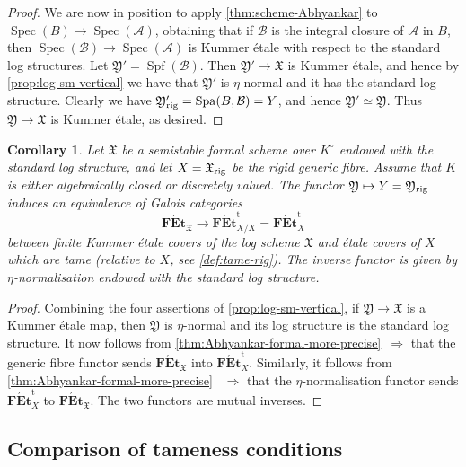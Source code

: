\documentclass[a4paper,twoside,11pt,reqno]{amsart}
\newcommand{\fX}{{\mathfrak{X}}}
\newcommand{\fY}{{\mathfrak{Y}}}
\DeclareMathOperator{\Spec}{Spec}
\DeclareMathOperator{\Spf}{Spf}
\DeclareMathOperator{\Spa}{Spa}
\newcommand{\cat}[1]{\mathbf{#1}}
\newcommand{\FEt}{\cat{F\acute{E}t}}
\newcommand{\FEtt}{{\cat{F\acute{E}t}}^{\!\mathrm{t}}}
\newcommand{\rig}{{\rm rig}}
\newtheorem{cor}[thm]{Corollary}
\theoremstyle{definition}
\numberwithin{equation}{subsection}
\begin{document}
\begin{proof}
We are now in position to apply \cref{thm:scheme-Abhyankar} to $\Spec(B) \to \Spec(\mathcal{A})$, obtaining that if $\mathcal{B}$ is the integral closure of $\mathcal{A}$ in $B$, then $\Spec(\mathcal{B})\to\Spec(\mathcal{A})$ is Kummer \'etale with respect to the standard log structures. Let $\fY' = \Spf(\mathcal{B})$. Then $\fY'\to \fX$ is Kummer \'etale, and hence by \cref{prop:log-sm-vertical} we have that $\fY'$ is $\eta$-normal and it has the standard log structure. Clearly we have $\fY'_\rig = \Spa(B, \mathcal{B}) = Y$, and hence $\fY'\simeq \fY$. Thus $\fY\to \fX$ is Kummer \'etale, as desired.
\end{proof}

\begin{cor}
\label{cor:generic fibre and eta normalisation}
    Let $\fX$ be a semistable formal scheme over $K^\circ$ endowed with the standard log structure, and let $X=\fX_{\rig}$ be the rigid generic fibre.  Assume that $K$ is either algebraically closed or discretely valued. 
    The functor $\fY \mapsto Y = \fY_{\rm rig}$ induces an equivalence of Galois categories
    \[
    \FEt_\fX \longrightarrow \FEtt_{X/X} =\FEtt_X
    \]
    between finite Kummer \'etale covers of the log scheme $\fX$ and \'etale covers of $X$ which are tame (relative to $X$, see \cref{def:tame-rig}).
    The inverse functor is given by $\eta$-normalisation endowed with the standard log structure.
\end{cor}

\begin{proof}
Combining the four assertions of \cref{prop:log-sm-vertical},
if $\fY\to \fX$ is a Kummer \'etale map, then $\fY$ is $\eta$-normal and its log structure is the standard log structure. It now follows from \cref{thm:Abhyankar-formal-more-precise}~$\Rightarrow$ that the generic fibre functor sends $\FEt_\fX$ into $\FEtt_{X}$.  Similarly, it follows from \cref{thm:Abhyankar-formal-more-precise}~ $\Rightarrow$ that the $\eta$-normalisation functor sends $\FEtt_{X}$ to $\FEt_\fX$. The two functors are mutual inverses. 
\end{proof}


\subsection{Comparison of tameness conditions}
\label{ss:tameness-comparison-pre}
\end{document}
